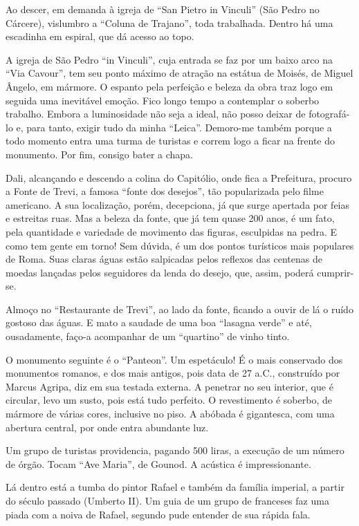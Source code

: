 Ao descer, em demanda à igreja de ``San Pietro in Vinculi'' (São Pedro no Cárcere), vislumbro a ``Coluna de Trajano'', toda trabalhada. Dentro há uma escadinha em espiral, que dá acesso ao topo.

A igreja de São Pedro ``in Vinculi'', cuja entrada se faz por um baixo arco na ``Via Cavour'', tem seu ponto máximo de atração na estátua de Moisés, de Miguel Ângelo, em mármore. O espanto pela perfeição e beleza da obra traz logo em seguida uma inevitável emoção. Fico longo tempo a contemplar o soberbo trabalho. Embora a luminosidade não seja a ideal, não posso deixar de fotografá-lo e, para tanto, exigir tudo da minha ``Leica''. Demoro-me também porque a todo momento entra uma turma de turistas e correm logo a ficar na frente do monumento. Por fim, consigo bater a chapa.

Dali, alcançando e descendo a colina do Capitólio, onde fica a Prefeitura, procuro a Fonte de Trevi, a famosa ``fonte dos desejos'', tão popularizada pelo filme americano. A sua localização, porém, decepciona, já que surge apertada por feias e estreitas ruas. Mas a beleza da fonte, que já tem quase 200 anos, é um fato, pela quantidade e variedade de movimento das figuras, esculpidas na pedra. E como tem gente em torno! Sem dúvida, é um dos pontos turísticos mais populares de Roma. Suas claras águas estão salpicadas pelos reflexos das centenas de moedas lançadas pelos seguidores da lenda do desejo, que, assim, poderá cumprir-se.

Almoço no ``Restaurante de Trevi'', ao lado da fonte, ficando a ouvir de lá o ruído gostoso das águas. E mato a saudade de uma boa ``lasagna verde'' e até, ousadamente, faço-a acompanhar de um ``quartino'' de vinho tinto.

O monumento seguinte é o ``Panteon''. Um espetáculo! É o mais conservado dos monumentos romanos, e dos mais antigos, pois data de 27 a.C., construído por Marcus Agripa, diz em sua testada externa. A penetrar no seu interior, que é circular, levo um susto, pois está tudo perfeito. O revestimento é soberbo, de mármore de várias cores, inclusive no piso. A abóbada é gigantesca, com uma abertura central, por onde entra abundante luz.

Um grupo de turistas providencia, pagando 500 liras, a execução de um número de órgão. Tocam ``Ave Maria'', de Gounod. A acústica é impressionante.

Lá dentro está a tumba do pintor Rafael e também da família imperial, a partir do século passado (Umberto II). Um guia de um grupo de franceses faz uma piada com a noiva de Rafael, segundo pude entender de sua rápida fala.

